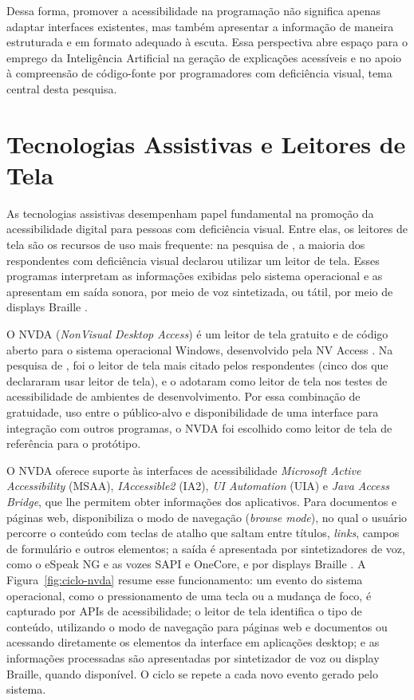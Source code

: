 \documentclass[
    12pt,                   %
    openright,              %
    oneside,                %
    a4paper,                %
    sumario=tradicional,    %
    english,                %
    brazil,                 %
    ]{abntex2}
\begin{document}
Dessa forma, promover a acessibilidade na programação não significa apenas adaptar interfaces existentes, mas também apresentar a informação de maneira estruturada e em formato adequado à escuta. Essa perspectiva abre espaço para o emprego da Inteligência Artificial na geração de explicações acessíveis e no apoio à compreensão de código-fonte por programadores com deficiência visual, tema central desta pesquisa.

\section{Tecnologias Assistivas e Leitores de Tela}\label{sec:TecAssistivas}

As tecnologias assistivas desempenham papel fundamental na promoção da acessibilidade digital para pessoas com deficiência visual. Entre elas, os leitores de tela são os recursos de uso mais frequente: na pesquisa de \textcite{latinoware20457}, a maioria dos respondentes com deficiência visual declarou utilizar um leitor de tela. Esses programas interpretam as informações exibidas pelo sistema operacional e as apresentam em saída sonora, por meio de voz sintetizada, ou tátil, por meio de displays Braille \cite{nvaccess2026guia}.

O NVDA (\textit{NonVisual Desktop Access}) é um leitor de tela gratuito e de código aberto para o sistema operacional Windows, desenvolvido pela NV Access \cite{nvaccess2026guia}. Na pesquisa de \textcite{latinoware20457}, foi o leitor de tela mais citado pelos respondentes (cinco dos que declararam usar leitor de tela), e \textcite{latinoware6969} o adotaram como leitor de tela nos testes de acessibilidade de ambientes de desenvolvimento. Por essa combinação de gratuidade, uso entre o público-alvo e disponibilidade de uma interface para integração com outros programas, o NVDA foi escolhido como leitor de tela de referência para o protótipo.

O NVDA oferece suporte às interfaces de acessibilidade \textit{Microsoft Active Accessibility} (MSAA), \textit{IAccessible2} (IA2), \textit{UI Automation} (UIA) e \textit{Java Access Bridge}, que lhe permitem obter informações dos aplicativos. Para documentos e páginas web, disponibiliza o modo de navegação (\textit{browse mode}), no qual o usuário percorre o conteúdo com teclas de atalho que saltam entre títulos, \textit{links}, campos de formulário e outros elementos; a saída é apresentada por sintetizadores de voz, como o eSpeak NG e as vozes SAPI e OneCore, e por displays Braille \cite{nvaccess2026guia}. A Figura~\ref{fig:ciclo-nvda} resume esse funcionamento: um evento do sistema operacional, como o pressionamento de uma tecla ou a mudança de foco, é capturado por APIs de acessibilidade; o leitor de tela identifica o tipo de conteúdo, utilizando o modo de navegação para páginas web e documentos ou acessando diretamente os elementos da interface em aplicações desktop; e as informações processadas são apresentadas por sintetizador de voz ou display Braille, quando disponível. O ciclo se repete a cada novo evento gerado pelo sistema.
\end{document}
